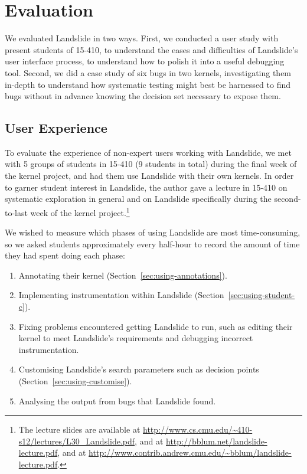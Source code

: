 \chapter{Evaluation}

We evaluated Landslide in two ways.
First, we conducted a user study with present students of 15-410, to understand the eases and difficulties of Landslide's user interface process, to understand how to polish it into a useful debugging tool.
Second, we did a case study of six bugs in two kernels, investigating them in-depth to understand how systematic testing might best be harnessed to find bugs without in advance knowing the decision set necessary to expose them.

\section{User Experience}
\label{sec:eval-studence}

To evaluate the experience of non-expert users working with Landslide, we met with 5 groups of students in 15-410 (9 students in total) during the final week of the kernel project, and had them use Landslide with their own kernels.
In order to garner student interest in Landslide, the author gave a lecture in 15-410 on systematic exploration in general and on Landslide specifically during the second-to-last week of the kernel project.\footnote{
The lecture slides are available at \url{http://www.cs.cmu.edu/~410-s12/lectures/L30_Landslide.pdf}, and at \url{http://bblum.net/landslide-lecture.pdf}, and at \url{http://www.contrib.andrew.cmu.edu/~bblum/landslide-lecture.pdf}.}

We wished to measure which phases of using Landslide are most time-consuming, so we asked students approximately every half-hour to record the amount of time they had spent doing each phase:

\begin{enumerate}
	\item Annotating their kernel (Section~\ref{sec:using-annotations}).
	\item Implementing instrumentation within Landslide (Section~\ref{sec:using-student-c}).
	\item Fixing problems encountered getting Landslide to run, such as editing their kernel to meet Landslide's requirements and debugging incorrect instrumentation.
	\item Customising Landslide's search parameters such as decision points (Section~\ref{sec:using-customise}).
	\item Analysing the output from bugs that Landslide found.
\end{enumerate}

